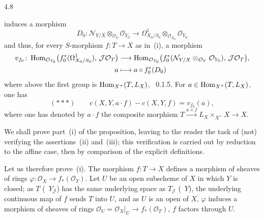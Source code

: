 \begin{proposition}{4.8}
\begin{enumeratei}
induces a morphism
\[
D_{0}\colon
\mathcal{N}_{Y/X}\otimes_{\mathcal{O}_{Y}}\mathcal{O}_{Y_{0}}
\longrightarrow
\Omega^{1}_{X_{0}/S_{0}}\otimes_{\mathcal{O}_{X_{0}}}\mathcal{O}_{Y_{0}}
\]
and thus, for every \(S\)-morphism \(f\colon T\to X\) as in~(i), a morphism
\begin{align*}
v_{f_{0}}\colon
\operatorname{Hom}_{\mathcal{O}_{T_{0}}}\bigl(f_{0}^{*}(\Omega^{1}_{X_{0}/S_{0}}),\,\mathcal{J}\mathcal{O}_{T}\bigr)
&\longrightarrow
\operatorname{Hom}_{\mathcal{O}_{T_{0}}}\bigl(f_{0}^{*}(\mathcal{N}_{Y/X}\otimes_{\mathcal{O}_{Y}}\mathcal{O}_{Y_{0}}),\,\mathcal{J}\mathcal{O}_{T}\bigr),
\\
a&\longmapsto a\circ f_{0}^{*}(D_{0})
\end{align*}
where above the first group is \(\operatorname{Hom}_{X^{+}}(T,L_{X})\), \cf~0.1.5. For \(a\in\operatorname{Hom}_{X^{+}}(T,L_{X})\), one has
\[
(***)\qquad
c(X,Y,a\cdot f)-c(X,Y,f)=v_{f_{0}}(a),
\]
where one has denoted by \(a\cdot f\) the composite morphism \(T\xrightarrow{a\times f}L_{X}\times_{X^{+}}X\to X\).
\end{enumeratei}
\end{proposition}

We shall prove part~(i) of the proposition, leaving to the reader the task of (not) verifying the assertions~(ii) and~(iii); this verification is carried out by reduction to the affine case, then by comparison of the explicit definitions.%
{\renewcommand{\thefootnote}{(94)}}

Let us therefore prove~(i). The morphism \(f\colon T\to X\) defines a morphism of sheaves of rings \(\varphi\colon\mathcal{O}_{X}\to f_{*}(\mathcal{O}_{T})\).%
{\renewcommand{\thefootnote}{(95)}}
Let \(U\) be an open subscheme of \(X\) in which \(Y\) is closed; as \(T\) (\resp\ \(Y_{\mathcal{J}}\)) has the same underlying space as \(T_{\mathcal{J}}\) (\resp\ \(Y\)), the underlying continuous map of \(f\) sends \(T\) into \(U\), and as \(U\) is an open of \(X\), \(\varphi\) induces a morphism of sheaves of rings \(\mathcal{O}_{U}=\mathcal{O}_{X}|_{U}\to f_{*}(\mathcal{O}_{T})\), \ie \(f\) factors through \(U\).

